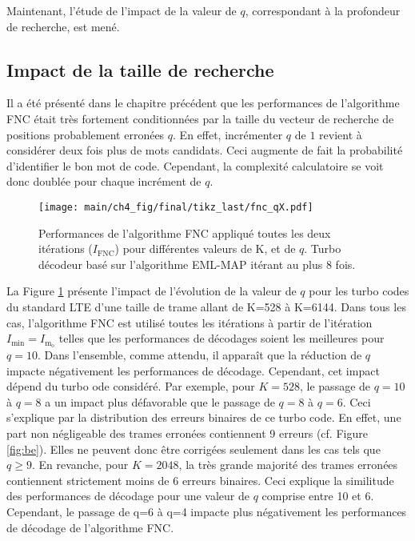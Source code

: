 Maintenant, l'étude de l'impact de la valeur de $q$, correspondant à la profondeur de recherche, est mené.

\subsection{Impact de la taille de recherche}
Il a été présenté dans le chapitre précédent que les performances de l'algorithme FNC était très fortement conditionnées
par la taille du vecteur de recherche de positions probablement erronées $q$. En effet, incrémenter $q$ de $1$ revient 
à considérer deux fois plus de mots candidats. Ceci augmente de fait la probabilité d'identifier le bon mot de code. 
Cependant, la complexité calculatoire se voit donc doublée pour chaque incrément de $q$. 

\begin{figure}[!t]
	\hspace*{-.075\textwidth}
	\texttt{[image: main/ch4\_fig/final/tikz\_last/fnc\_qX.pdf]}
	\caption{Performances de l'algorithme FNC appliqué toutes les deux itérations ($I_\text{FNC}$) pour différentes 
	valeurs de K, et de $q$.
	Turbo décodeur basé sur l'algorithme EML-MAP itérant au plus 8 fois.
	\label{fig:fnc_q}}
\end{figure}

La Figure \ref{fig:fnc_q} présente l'impact de l'évolution de la valeur de $q$ pour les turbo codes du standard LTE 
d'une taille de trame allant de K=528 à K=6144. Dans tous les cas, l'algorithme FNC est utilisé toutes les itérations à 
partir de l'itération $I_\text{min} = I_{\text{m}_\text{o}}$ telles que les performances de décodages 
soient les meilleures pour $q=10$. Dans l'ensemble, comme attendu, il apparaît que la réduction de $q$ impacte 
négativement les performances de décodage. Cependant, cet impact dépend du turbo ode considéré. Par exemple, pour 
$K=528$, le passage de $q=10$ à $q=8$ a un impact plus défavorable que le passage de $q=8$ à $q=6$. Ceci s'explique par
la distribution des erreurs binaires de ce turbo code. En effet, une part non négligeable des trames erronées contiennent
9 erreurs (cf. Figure \ref{fig:be}). Elles ne peuvent donc être corrigées seulement dans les cas tels que $q\geq 9$. En 
revanche, pour $K=2048$, la très grande majorité des trames erronées contiennent strictement moins de 6 erreurs binaires.
Ceci explique la similitude des performances de décodage pour une valeur de $q$ comprise entre 10 et 6. Cependant, le 
passage de q=6 à q=4 impacte plus négativement les performances de décodage de l'algorithme FNC.

